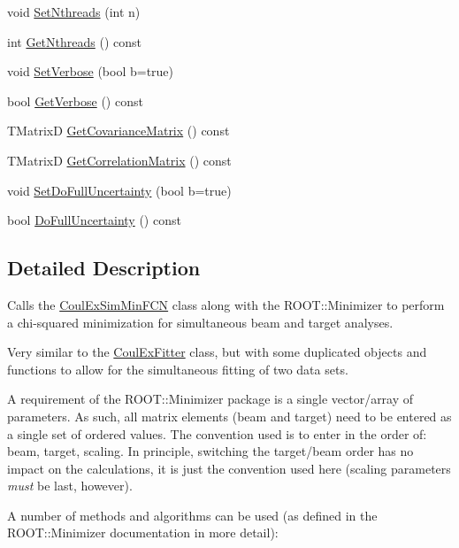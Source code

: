 \begin{DoxyCompactItemize}
\item 
void \hyperlink{classCoulExSimFitter_a900dcc1fe094d4d4890d52c48f6240ca}{Set\-Nthreads} (int n)
\item 
int \hyperlink{classCoulExSimFitter_a2b33f0db4913d47610c616e0609709a4}{Get\-Nthreads} () const 
\item 
void \hyperlink{classCoulExSimFitter_a3ed1f75a477a2386c801c9b003c11aed}{Set\-Verbose} (bool b=true)
\item 
bool \hyperlink{classCoulExSimFitter_abbcbf6dd58cc2bb7e069ca28335e0519}{Get\-Verbose} () const 
\item 
T\-Matrix\-D \hyperlink{classCoulExSimFitter_ad91f2c1cc9a8f70bcbb0230332512f74}{Get\-Covariance\-Matrix} () const 
\item 
T\-Matrix\-D \hyperlink{classCoulExSimFitter_a03d49714b01305301f4cdbcd768c75ea}{Get\-Correlation\-Matrix} () const 
\item 
void \hyperlink{classCoulExSimFitter_a74d529e145d3fdd3e2e6ae678f89710e}{Set\-Do\-Full\-Uncertainty} (bool b=true)
\item 
bool \hyperlink{classCoulExSimFitter_a4f9ea9189d5f8d21c765b9fe9f0a0508}{Do\-Full\-Uncertainty} () const 
\end{DoxyCompactItemize}


\subsection{Detailed Description}
Calls the \hyperlink{classCoulExSimMinFCN}{Coul\-Ex\-Sim\-Min\-F\-C\-N} class along with the R\-O\-O\-T\-::\-Minimizer to perform a chi-\/squared minimization for simultaneous beam and target analyses. 

Very similar to the \hyperlink{classCoulExFitter}{Coul\-Ex\-Fitter} class, but with some duplicated objects and functions to allow for the simultaneous fitting of two data sets.

A requirement of the R\-O\-O\-T\-::\-Minimizer package is a single vector/array of parameters. As such, all matrix elements (beam and target) need to be entered as a single set of ordered values. The convention used is to enter in the order of\-: beam, target, scaling. In principle, switching the target/beam order has no impact on the calculations, it is just the convention used here (scaling parameters {\itshape must} be last, however).

A number of methods and algorithms can be used (as defined in the R\-O\-O\-T\-::\-Minimizer documentation in more detail)\-:

